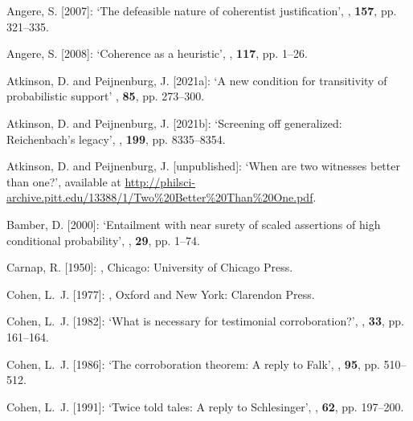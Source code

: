 \documentclass[a4paper,11pt]{article}
\begin{document}
\begin{thebibliography}{}

Angere, S. [2007]:
\newblock `The defeasible nature of coherentist justification',
, \textbf{157}, pp. 321--335.

Angere, S. [2008]:
\newblock `Coherence as a heuristic',
, \textbf{117}, pp. 1--26.

Atkinson, D. and Peijnenburg, J. [2021a]:
\newblock `A new condition for transitivity of probabilistic support'
, \textbf{85}, pp. 273--300.

Atkinson, D. and Peijnenburg, J. [2021b]:
\newblock `Screening off generalized: Reichenbach's legacy',
, \textbf{199}, pp. 8335--8354.

Atkinson, D. and Peijnenburg, J. [unpublished]:
\newblock `When are two witnesses better than one?',
\newblock available at \href{http://philsci-archive.pitt.edu/13388/1/Two\%20Better\%20Than\%20One.pdf}{http://philsci-archive.pitt.edu/13388/1/Two\%20Better\%20Than\%20One.pdf}.

Bamber, D. [2000]:
\newblock `Entailment with near surety of scaled assertions of high conditional
  probability',
, \textbf{29}, pp. 1--74.

Carnap, R. [1950]:
,
\newblock Chicago: University of Chicago Press.

Cohen, L.~J. [1977]:
,
\newblock Oxford and New York: Clarendon Press.

Cohen, L.~J. [1982]:
\newblock `What is necessary for testimonial corroboration?',
, \textbf{33}, pp. 161--164.

Cohen, L.~J. [1986]:
\newblock `The corroboration theorem: A reply to {F}alk',
, \textbf{95}, pp. 510--512.

Cohen, L.~J. [1991]:
\newblock `Twice told tales: A reply to {S}chlesinger',
, \textbf{62}, pp. 197--200.


\end{thebibliography}
\end{document}
